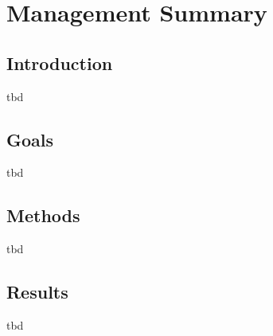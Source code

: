 
\chapter{Management Summary}

\section*{Introduction}
tbd

\section*{Goals}
tbd

\section*{Methods}
tbd

\section*{Results}
tbd